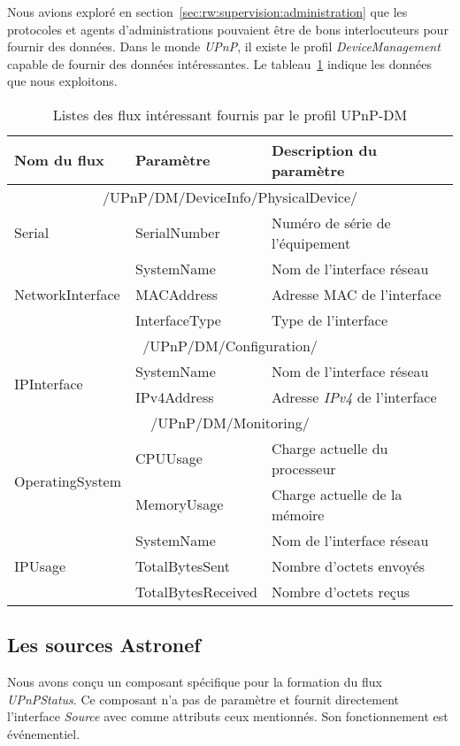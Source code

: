 Nous avions exploré en section~\ref{sec:rw:supervision:administration} que les protocoles et agents d'administrations pouvaient être de bons interlocuteurs pour fournir des données. Dans le monde \textit{UPnP}, il existe le profil \textit{DeviceManagement} capable de fournir des données intéressantes. Le tableau~\ref{tab:valid:domvision:upnpdm} indique les données que nous exploitons. 

\begin{table}
\centering
\begin{tabular}{|m{}|>{\ttfamily}m{}|m{}|} \bottomrule
\rowcolor{hypcolor} Nom du flux & \rm Paramètre & Description du paramètre\\ \hline
\multicolumn{3}{|c|}{/UPnP/DM/DeviceInfo/PhysicalDevice/} \\\hline
Serial & {SerialNumber} & Numéro de série de l'équipement\\\hline
\multirow{3}{*}{NetworkInterface} & {SystemName} & Nom de l'interface réseau\\\cline{2-3}
& {MACAddress} & Adresse MAC de l'interface\\\cline{2-3}
& InterfaceType & Type de l'interface \\\hline
\multicolumn{3}{|c|}{/UPnP/DM/Configuration/} \\\hline
\multirow{2}{*}{IPInterface} & SystemName & Nom de l'interface réseau \\\cline{2-3}
& IPv4Address & Adresse \textit{IPv4} de l'interface \\ \hline
\multicolumn{3}{|c|}{/UPnP/DM/Monitoring/} \\\hline
\multirow{2}{*}{OperatingSystem} & CPUUsage & Charge actuelle du processeur\\\cline{2-3}
& MemoryUsage & Charge actuelle de la mémoire\\ \hline
\multirow{3}{*}{IPUsage} & SystemName & Nom de l'interface réseau\\ \cline{2-3}
& TotalBytesSent & Nombre d'octets envoyés \\\cline{2-3}
& TotalBytesReceived & Nombre d'octets reçus \\ \toprule
\end{tabular}
\caption{Listes des flux intéressant fournis par le profil UPnP-DM}\label{tab:valid:domvision:upnpdm}
\end{table}

\subsection{Les sources Astronef}
Nous avons conçu un composant spécifique pour la formation du flux \textit{UPnPStatus}. Ce composant n'a pas de paramètre et fournit directement l'interface \textit{Source} avec comme attributs ceux mentionnés. Son fonctionnement est événementiel.

